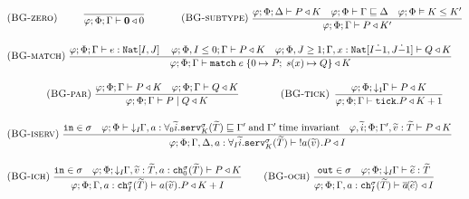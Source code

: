 \begin{table*}
    \begin{framed}\vspace{-1em}\begin{align*}
        &\kern46em\\[-2em] %
        &\kern0em\runa{BG-zero}\infrule{}{\varphi;\Phi;\Gamma \vdash \withcomplex{\nil}{0}}\!\!
        \runa{BG-subtype}\;\infrule{\varphi;\Phi;\Delta \vdash \withcomplex{P}{K} \quad \varphi;\Phi \vdash \Gamma \sqsubseteq \Delta \quad \varphi; \Phi \vDash K \leq K'}{\varphi;\Phi;\Gamma \vdash \withcomplex{P}{K'}}
        \\[-1em]
        &\kern-0em\runa{BG-match}\;\infrule{\varphi;\Phi;\Gamma \vdash \withtype{e}{\natinterval{I}{J}} \quad \varphi;\Phi, I \leq 0;\Gamma \vdash \withcomplex{P}{K} \quad \varphi;\Phi, J \geq 1;\Gamma, \withtype{x}{\natinterval{I\monus 1}{J\monus 1}} \vdash \withcomplex{Q}{K}}{\varphi;\Phi;\Gamma \vdash \withcomplex{\match{e}{P}{x}{Q}}{K}}\\[-1em]
        &\kern4em\runa{BG-par}\;\infrule{\varphi;\Phi;\Gamma\vdash P \triangleleft K\quad \varphi;\Phi;\Gamma\vdash Q \triangleleft K}{\varphi;\Phi;\Gamma\vdash \parcomp{P}{Q} \triangleleft K}\quad\quad\quad\quad\quad\quad \runa{BG-tick}\;\infrule{\varphi;\Phi;\susumesim{\Gamma}{1}\vdash P \triangleleft K}{\varphi;\Phi;\Gamma\vdash \tick P \triangleleft K + 1}\\[-1em]
        &\kern-0em\runa{BG-iserv}\;\infrule{\texttt{in}\in\sigma\quad \varphi;\Phi\vdash\;\susumesim{\Gamma}{I},a:\forall_0\widetilde{i}.\texttt{serv}^\sigma_K(\widetilde{T}) \sqsubseteq \Gamma'\;\text{and}\; \Gamma'\;\text{time invariant}\quad \varphi,\widetilde{i};\Phi;\Gamma',\widetilde{v} : \widetilde{T}\vdash P \triangleleft K}{\varphi;\Phi;\Gamma,\Delta,a : \servt{I}{\widetilde{i}}{\sigma}{K}{\widetilde{T}}\vdash\; \bang\inputch{a}{\widetilde{v}}{}{P}\triangleleft I}\\[-1em]
        &\kern-0em\runa{BG-ich}\;\infrule{\texttt{in}\in\sigma\quad \varphi;\Phi;\susumesim{\Gamma}{I},\widetilde{v} : \widetilde{T}, a : \chant{\sigma}{0}{\widetilde{T}}\vdash P \triangleleft K}{\varphi;\Phi;\Gamma, a : \chant{\sigma}{I}{\widetilde{T}}\vdash \inputch{a}{\widetilde{v}}{}{P}\triangleleft K + I}\kern8.5em \runa{BG-och}\;\infrule{\texttt{out}\in\sigma\quad \varphi;\Phi;\susumesim{\Gamma}{I}\vdash \widetilde{e} : \widetilde{T}}{\varphi;\Phi;\Gamma,a:\chant{\sigma}{I}{\widetilde{T}}\vdash \asyncoutputch{a}{\widetilde{e}}{} \triangleleft I}\\[-1em]

\end{align*}
\end{framed}
\end{table*}
